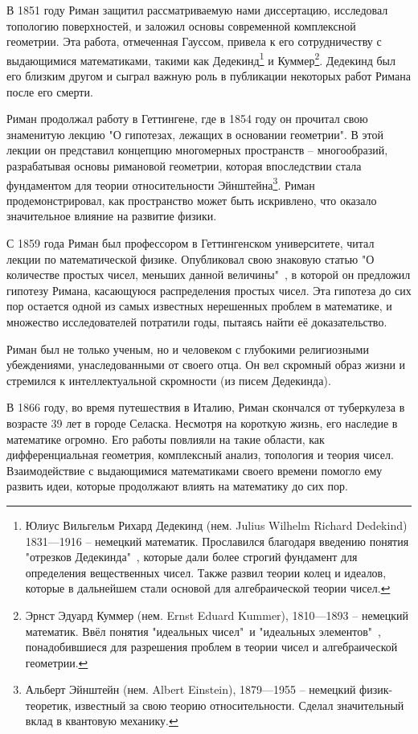 \documentclass[a4paper,12pt]{article}
\theoremstyle{remark}
\begin{document}
В 1851 году Риман защитил рассматриваемую нами диссертацию,
исследовал топологию поверхностей, и заложил основы современной
комплексной геометрии. Эта работа, отмеченная Гауссом, привела
к его сотрудничеству с выдающимися математиками, такими как
Дедекинд\footnote{
  Юлиус Вильгельм Рихард Дедекинд (нем. Julius Wilhelm Richard Dedekind) 1831—1916 --
  немецкий математик. Прославился благодаря введению понятия "отрезков Дедекинда"\ ,
  которые дали более строгий фундамент для определения вещественных чисел.
  Также развил теории колец и идеалов, которые в дальнейшем стали основой для алгебраической теории чисел.
} и Куммер\footnote{
  Эрнст Эдуард Куммер (нем. Ernst Eduard Kummer), 1810—1893 --
  немецкий математик. Ввёл понятия "идеальных чисел"\ и "идеальных элементов"\ , понадобившиеся для разрешения проблем в теории чисел и алгебраической геометрии.
}. Дедекинд был его близким другом и сыграл важную роль в публикации
некоторых работ Римана после его смерти.

Риман продолжал работу в Геттингене, где в 1854 году он
прочитал свою знаменитую лекцию "О гипотезах, лежащих в основании геометрии".
В этой лекции он представил концепцию многомерных пространств -- многообразий,
разрабатывая основы римановой геометрии, которая впоследствии стала
фундаментом для теории относительности Эйнштейна\footnote{
  Альберт Эйнштейн (нем. Albert Einstein), 1879—1955 --
  немецкий физик-теоретик, известный за свою теорию относительности.
  Сделал значительный вклад в квантовую механику.
}. Риман продемонстрировал, как пространство может быть искривлено, что
оказало значительное влияние на развитие физики.

С 1859 года Риман был профессором в Геттингенском университете, читал
лекции по математической физике. Опубликовал свою знаковую статью "О количестве
простых чисел, меньших данной величины"\ \cite{Hypothesis}, в которой он предложил
гипотезу Римана, касающуюся распределения простых чисел. Эта гипотеза
до сих пор остается одной из самых известных нерешенных проблем
в математике, и множество исследователей потратили годы, пытаясь
найти её доказательство.

Риман был не только ученым, но и человеком с глубокими религиозными
убеждениями, унаследованными от своего отца.
Он вел скромный образ жизни и стремился к интеллектуальной скромности (из писем Дедекинда).

В 1866 году, во время путешествия в Италию, Риман скончался от туберкулеза
в возрасте 39 лет в городе Селаска. Несмотря на короткую жизнь, его наследие в математике
огромно. Его работы повлияли на такие области, как дифференциальная геометрия,
комплексный анализ, топология и теория чисел. Взаимодействие с выдающимися
математиками своего времени помогло ему развить идеи, которые продолжают
влиять на математику до сих пор.
\end{document}
